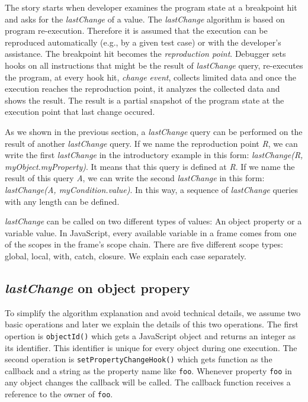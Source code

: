 \documentclass[preprint]{sigplanconf}
\begin{document}
The story starts when developer examines the program state at a breakpoint hit and asks for the \textit{lastChange} of a value. The \textit{lastChange} algorithm is based on program re-execution. Therefore it is assumed that the execution can be reproduced automatically (e.g., by a given test case) or with the developer's assistance. The breakpoint hit becomes the \textit{reproduction point}. Debugger sets hooks on all instructions that might be the result of \textit{lastChange} query, re-executes the program, at every hook hit, \textit{change event}, collects limited data and once the execution reaches the reproduction point, it analyzes the collected data and shows the result. The result is a partial snapshot of the program state at the execution point that last change occured. 

As we shown in the previous section, a \textit{lastChange} query can be performed on the result of another \textit{lastChange} query. If we name the reproduction point \textit{R}, we can write the first \textit{lastChange} in the introductory example in this form: \textit{lastChange(R, myObject.myProperty)}. It means that this query is defined at \textit{R}. If we name the result of this query \textit{A}, we can write the second \textit{lastChange} in this form: \textit{lastChange(A, myCondition.value)}. In this way, a sequence of \textit{lastChange} queries with any length can be defined.

\textit{lastChange} can be called on two different types of values: An object property or a variable value. In JavaScript, every available variable in a frame comes from one of the scopes in the frame's scope chain. There are five different scope types: global, local, with, catch, closure. We explain each case separately.

\subsection{\textit{lastChange} on object propery}
To simplify the algorithm explanation and avoid technical details, we assume two basic operations and later we explain the details of this two operations. The first opertion is \texttt{objectId()} which gets a JavaScript object and returns an integer as its identifier. This identifier is unique for every object during one execution. The second operation is \texttt{setPropertyChangeHook()} which gets function as the callback and a string as the property name like \texttt{foo}. Whenever property \texttt{foo} in any object changes the callback will be called. The callback function receives a reference to the owner of \texttt{foo}.
\end{document}

